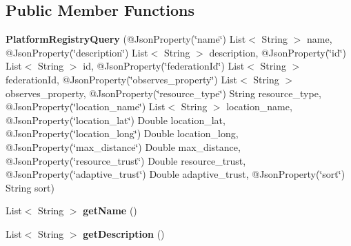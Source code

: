 \subsection*{Public Member Functions}
\begin{DoxyCompactItemize}
\item 
\mbox{\label{classeu_1_1h2020_1_1symbiote_1_1cloud_1_1model_1_1internal_1_1PlatformRegistryQuery_ad78110bae1638f4bfa6ff9b804fc71ec}} 
{\bfseries Platform\+Registry\+Query} (@Json\+Property(\char`\"{}name\char`\"{}) List$<$ String $>$ name, @Json\+Property(\char`\"{}description\char`\"{}) List$<$ String $>$ description, @Json\+Property(\char`\"{}id\char`\"{}) List$<$ String $>$ id, @Json\+Property(\char`\"{}federation\+Id\char`\"{}) List$<$ String $>$ federation\+Id, @Json\+Property(\char`\"{}observes\+\_\+property\char`\"{}) List$<$ String $>$ observes\+\_\+property, @Json\+Property(\char`\"{}resource\+\_\+type\char`\"{}) String resource\+\_\+type, @Json\+Property(\char`\"{}location\+\_\+name\char`\"{}) List$<$ String $>$ location\+\_\+name, @Json\+Property(\char`\"{}location\+\_\+lat\char`\"{}) Double location\+\_\+lat, @Json\+Property(\char`\"{}location\+\_\+long\char`\"{}) Double location\+\_\+long, @Json\+Property(\char`\"{}max\+\_\+distance\char`\"{}) Double max\+\_\+distance, @Json\+Property(\char`\"{}resource\+\_\+trust\char`\"{}) Double resource\+\_\+trust, @Json\+Property(\char`\"{}adaptive\+\_\+trust\char`\"{}) Double adaptive\+\_\+trust, @Json\+Property(\char`\"{}sort\char`\"{}) String sort)
\item 
\mbox{\label{classeu_1_1h2020_1_1symbiote_1_1cloud_1_1model_1_1internal_1_1PlatformRegistryQuery_a78702491d7988454cebff3c63160b4cf}} 
List$<$ String $>$ {\bfseries get\+Name} ()
\item 
\mbox{\label{classeu_1_1h2020_1_1symbiote_1_1cloud_1_1model_1_1internal_1_1PlatformRegistryQuery_abd5380fa4aa23846a2c7c757194f7e83}} 
List$<$ String $>$ {\bfseries get\+Description} ()
\item 
\mbox{\label{classeu_1_1h2020_1_1symbiote_1_1cloud_1_1model_1_1internal_1_1PlatformRegistryQuery_aadaeed9ab093311b79eaf74a643a4cac}} 

\end{DoxyCompactItemize}
